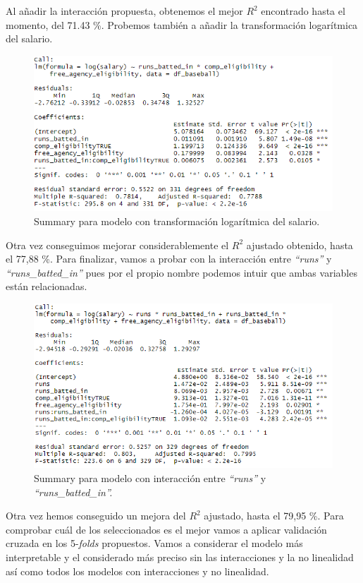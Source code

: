\documentclass[a4paper,12pt, oneside]{book}
\begin{document}
Al añadir la interacción propuesta, obtenemos el mejor $R^2$ encontrado hasta el momento, del 71.43 \%. Probemos también a añadir la transformación logarítmica del salario.\\

\begin{figure}[H]
\centering
\includegraphics[scale=0.7]{images/summarylog.png}
\caption{Summary para modelo con transformación logarítmica del salario.}
\end{figure}

Otra vez conseguimos mejorar considerablemente el $R^2$ ajustado obtenido, hasta el 77,88 \%. Para finalizar, vamos a probar con la interacción entre \textit{``runs''} y \textit{``runs\_batted\_in''} pues por el propio nombre podemos intuir que ambas variables están relacionadas.

\begin{figure}[H]
\centering
\includegraphics[scale=0.7]{images/runsinteract.png}
\caption{Summary para modelo con interacción entre \textit{``runs''} y \textit{``runs\_batted\_in''.}}
\end{figure}

Otra vez hemos conseguido un mejora del $R^2$ ajustado, hasta el 79,95 \%. Para comprobar cuál de los seleccionados es el mejor vamos a aplicar validación cruzada en los 5-\textit{folds} propuestos. Vamos a considerar el modelo más interpretable y el considerado más preciso sin las interacciones y la no linealidad así como todos los modelos con interacciones y no linealidad.
\end{document}
